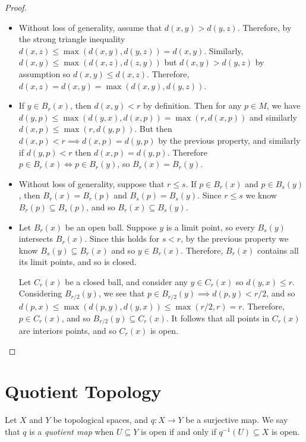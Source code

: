 \begin{proof}
    \begin{itemize}
        \item Without loss of generality, assume that $d(x, y) > d(y,z)$. Therefore, by the strong triangle inequality $d(x, z) \leq \max(d(x,y),d(y,z)) = d(x,y)$. Similarly, $d(x,y) \leq \max(d(x,z),d(z,y))$ but $d(x,y) > d(y,z)$ by assumption so $d(x,y) \leq d(x,z)$. Therefore, $d(x,z) = d(x,y) = \max(d(x,y),d(y,z))$.
        \item If $y \in B_r(x)$, then $d(x,y) < r$ by definition. Then for any $p \in M$, we have $d(y, p) \leq \max(d(y,x), d(x,p)) = \max(r, d(x, p))$ and similarly $d(x,p) \leq \max(r, d(y, p))$. But then $d(x, p) < r \implies d(x,p) = d(y,p)$ by the previous property, and similarly if $d(y,p) < r$ then $d(x,p) = d(y,p)$. Therefore $p \in B_r(x) \iff p \in B_r(y)$, so $B_r(x) = B_r(y)$.
        \item Without loss of generality, suppose that $r \leq s$. If $p \in B_r(x)$ and $p \in B_s(y)$, then $B_r(x) = B_r(p)$ and $B_s(p) = B_s(y)$. Since $r \leq s$ we know $B_r(p) \subseteq B_s(p)$, and so $B_r(x) \subseteq B_s(y)$.
        \item Let $B_r(x)$ be an open ball. Suppose $y$ is a limit point, so every $B_s(y)$ intersects $B_r(x)$. Since this holds for $s < r$, by the previous property we know $B_s(y) \subseteq B_r(x)$ and so $y \in B_r(x)$. Therefore, $B_r(x)$ contains all its limit points, and so is closed.

        Let $C_r(x)$ be a closed ball, and consider any $y \in C_r(x)$ so $d(y, x) \leq r$. Considering $B_{r/2}(y)$, we see that $p \in B_{r/2}(y) \implies d(p, y) < r/2$, and so $d(p, x) \leq \max(d(p, y), d(y, x)) \leq \max(r/2, r) = r$. Therefore, $p \in C_r(x)$, and so $B_{r/2}(y) \subseteq C_r(x)$. It follows that all points in $C_r(x)$ are interiors points, and so $C_r(x)$ is open.
    \end{itemize}
\end{proof}

\section{Quotient Topology}

\begin{defn}
    Let $X$ and $Y$ be topological spaces, and $q: X \to Y$ be a surjective map. We say that $q$ is a \emph{quotient map} when $U \subseteq Y$ is open if and only if $q^{-1}(U) \subseteq X$ is open.
\end{defn}


